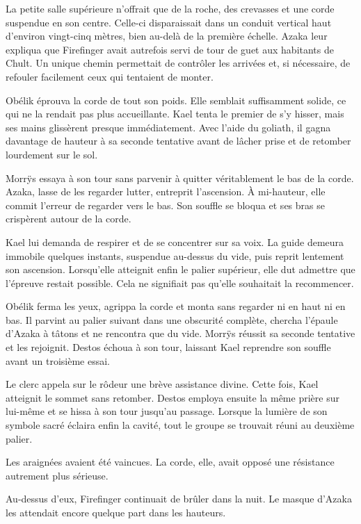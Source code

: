 La petite salle supérieure n'offrait que de la roche, des crevasses et une corde suspendue en son centre. Celle-ci disparaissait dans un conduit vertical haut d'environ vingt-cinq mètres, bien au-delà de la première échelle. Azaka leur expliqua que Firefinger avait autrefois servi de tour de guet aux habitants de Chult. Un unique chemin permettait de contrôler les arrivées et, si nécessaire, de refouler facilement ceux qui tentaient de monter.

Obélik éprouva la corde de tout son poids. Elle semblait suffisamment solide, ce qui ne la rendait pas plus accueillante. Kael tenta le premier de s'y hisser, mais ses mains glissèrent presque immédiatement. Avec l'aide du goliath, il gagna davantage de hauteur à sa seconde tentative avant de lâcher prise et de retomber lourdement sur le sol.

Morrÿs essaya à son tour sans parvenir à quitter véritablement le bas de la corde. Azaka, lasse de les regarder lutter, entreprit l'ascension. À mi-hauteur, elle commit l'erreur de regarder vers le bas. Son souffle se bloqua et ses bras se crispèrent autour de la corde.

Kael lui demanda de respirer et de se concentrer sur sa voix. La guide demeura immobile quelques instants, suspendue au-dessus du vide, puis reprit lentement son ascension. Lorsqu'elle atteignit enfin le palier supérieur, elle dut admettre que l'épreuve restait possible. Cela ne signifiait pas qu'elle souhaitait la recommencer.

Obélik ferma les yeux, agrippa la corde et monta sans regarder ni en haut ni en bas. Il parvint au palier suivant dans une obscurité complète, chercha l'épaule d'Azaka à tâtons et ne rencontra que du vide. Morrÿs réussit sa seconde tentative et les rejoignit. Destos échoua à son tour, laissant Kael reprendre son souffle avant un troisième essai.

Le clerc appela sur le rôdeur une brève assistance divine. Cette fois, Kael atteignit le sommet sans retomber. Destos employa ensuite la même prière sur lui-même et se hissa à son tour jusqu'au passage. Lorsque la lumière de son symbole sacré éclaira enfin la cavité, tout le groupe se trouvait réuni au deuxième palier.

\begin{narrateur}
Les araignées avaient été vaincues. La corde, elle, avait opposé une résistance autrement plus sérieuse.
\end{narrateur}

Au-dessus d'eux, Firefinger continuait de brûler dans la nuit. Le masque d'Azaka les attendait encore quelque part dans les hauteurs.
